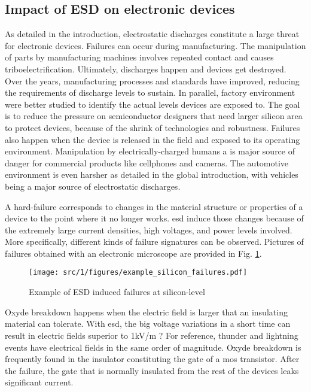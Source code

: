 \subsection{Impact of ESD on electronic devices}

As detailed in the introduction, electrostatic discharges constitute a large threat for electronic devices.
Failures can occur during manufacturing.
The manipulation of parts by manufacturing machines involves repeated contact and causes triboelectrification.
Ultimately, discharges happen and devices get destroyed.
Over the years, manufacturing processes and standards have improved, reducing the requirements of discharge levels to sustain.
In parallel, factory environment were better studied to identify the actual levels devices are exposed to.
The goal is to reduce the pressure on semiconductor designers that need larger silicon area to protect devices, because of the shrink of technologies and robustness.
Failures also happen when the device is released in the field and exposed to its operating environment.
Manipulation by electrically-charged humans a is major source of danger for commercial products like cellphones and cameras.
The automotive environment is even harsher as detailed in the global introduction, with vehicles being a major source of electrostatic discharges.

A hard-failure corresponds to changes in the material structure or properties of a device to the point where it no longer works.
\gls{esd} induce those changes because of the extremely large current densities, high voltages, and power levels involved.
More specifically, different kinds of failure signatures can be observed.
Pictures of failures obtained with an electronic microscope are provided in Fig. \ref{fig:silicon-level-failures}.

\begin{figure}[!h]
  \centering
  \texttt{[image: src/1/figures/example\_silicon\_failures.pdf]}
  \caption{Example of ESD induced failures at silicon-level}
  \label{fig:silicon-level-failures}
\end{figure}


Oxyde breakdown happens when the electric field is larger that an insulating material can tolerate.
With \gls{esd}, the big voltage variations in a short time can result in electric fields superior to 1kV/m ?
For reference, thunder and lightning events have electrical fields in the same order of magnitude.
Oxyde breakdown is frequently found in the insulator constituting the gate of a \gls{mos} transistor.
After the failure, the gate that is normally insulated from the rest of the devices leaks significant current.

